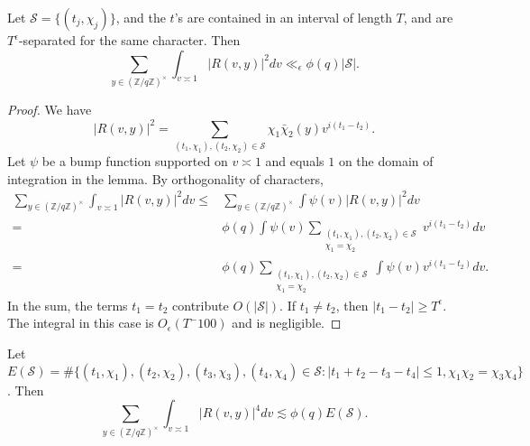 \begin{lemma} \label{secondmoment}
    Let $\mathcal{S}=\{(t_j,\chi_j)\}$, and the $t$'s are contained in an interval of length $T$, and are $T^\epsilon$-separated for the same character. Then \[
        \sum_{y\in (\mathbb{Z}/q\mathbb{Z})^\times} \int_{v\asymp 1} 
        \left|R\left(v,y\right)\right|^2dv \ll_{\epsilon} \phi(q)|\mathcal{S}|.
    \]
\end{lemma}
\begin{proof}
    We have \[
    |R(v,y)|^2 = \sum_{(t_1,\chi_1),(t_2,\chi_2)\in \mathcal{S}}
    \chi_1\bar{\chi}_2(y)v^{i(t_1-t_2)}.
    \]
    Let $\psi$ be a bump function supported on $v\asymp 1$ and equals $1$ on the domain of integration in the lemma.
    By orthogonality of characters, \begin{align*}
        \sum_{y\in (\mathbb{Z}/q\mathbb{Z})^\times} \int_{v\asymp 1} 
        \left|R\left(v,y\right)\right|^2dv 
        \leq&\sum_{y\in (\mathbb{Z}/q\mathbb{Z})^\times} \int 
        \psi(v)\left|R\left(v,y\right)\right|^2dv 
        \\=&
        \phi(q)\int \psi(v)
        \sum_{\substack{(t_1,\chi_1),(t_2,\chi_2)\in \mathcal{S}\\ \chi_1=\chi_2}}v^{i(t_1-t_2)}
        dv\\
        =&
        \phi(q)\sum_{\substack{(t_1,\chi_1),(t_2,\chi_2)\in \mathcal{S}\\ \chi_1=\chi_2}}\int \psi(v)
        v^{i(t_1-t_2)}
        dv.
    \end{align*}
    In the sum, the terms $t_1=t_2$ contribute $O(|\mathcal{S}|)$. If $t_1\neq t_2$, then $|t_1-t_2|\geq T^\epsilon$. The integral in this case is $O_\epsilon(T^-100)$ and is negligible.
\end{proof}
\begin{lemma}\label{fourthmoment}
    Let $E(\mathcal{S})=\#\{(t_1,\chi_1),(t_2,\chi_2),(t_3,\chi_3),(t_4,\chi_4)\in \mathcal{S}  :  |t_1+t_2-t_3-t_4|\leq 1, \chi_1\chi_2=\chi_3\chi_4\}$. Then \[
        \sum_{y\in (\mathbb{Z}/q\mathbb{Z})^\times} \int_{v\asymp 1} 
        \left|R\left(v,y\right)\right|^4dv  \lesssim \phi(q)E(\mathcal{S}).
    \]
\end{lemma}
